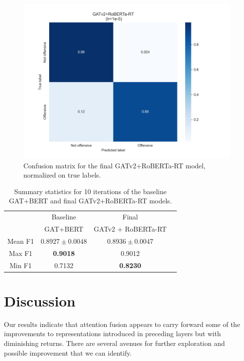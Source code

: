 \documentclass[letterpaper]{article} %
\begin{document}
\begin{figure}
    \includegraphics[width=\linewidth]{cm_final.png}
    \caption{Confusion matrix for the final GATv2+RoBERTa-RT model, normalized on true labels.}
\end{figure}

\begin{table}
    \begin{tabular}{|c||c|c|c|}
        \hline
         & Baseline & Final  \\
         & GAT+BERT & GATv2 + RoBERTa-RT  \\
        \hline
        \hline 
        Mean F1  & $0.8927\pm0.0048$ & $\mathbf{0.8936 \pm 0.0047}$  \\
        Max F1 & \textbf{0.9018} & 0.9012 \\
        Min F1 & 0.7132 & \textbf{0.8230} \\
        \hline
    \end{tabular}
    \caption{Summary statistics for 10 iterations of the baseline GAT+BERT and final GATv2+RoBERTa-RT models.}
\end{table}

\section{Discussion}

Our results indicate that attention fusion appears to carry forward some of the improvements to representations introduced in preceding layers but with diminishing returns. There are several avenues for further exploration and possible improvement that we can identify. 
\end{document}

